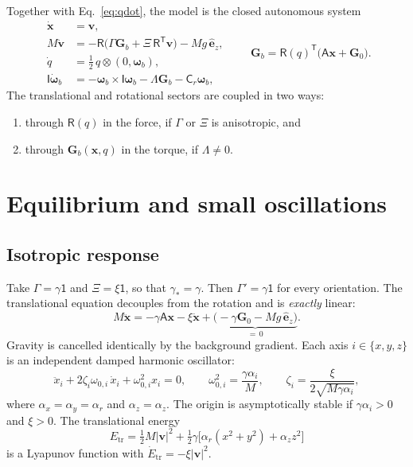 \documentclass[11pt]{article}
\newcommand{\vect}[1]{\bm{#1}}
\newcommand{\tens}[1]{\mathsf{#1}}
\newcommand{\ez}{\hat{\vect{e}}_z}
\newcommand{\Rm}{\tens{R}}
\newcommand{\Gl}{\vect{G}}
\newcommand{\Gb}{\vect{G}_{b}}
\newcommand{\T}{^{\mathsf{T}}}
\theoremstyle{remark}
\begin{document}
Together with Eq.~\eqref{eq:qdot}, the model is the closed autonomous
system
\begin{equation}
  \boxed{
  \begin{aligned}
    \dot{\vect{x}} &= \vect{v},\\
    M\dot{\vect{v}} &= -\Rm\bigl(\tens{\Gamma}\Gb + \tens{\Xi}\,\Rm\T\vect{v}\bigr) - Mg\,\ez,\\
    \dot q &= \tfrac12\,q\otimes(0,\vect{\omega}_b),\\
    \tens{I}\dot{\vect{\omega}}_b &= -\vect{\omega}_b\times\tens{I}\vect{\omega}_b
        - \tens{\Lambda}\Gb - \tens{C}_r\vect{\omega}_b,
  \end{aligned}
  \qquad \Gb = \Rm(q)\T\bigl(\tens{A}\vect{x}+\Gl_0\bigr).}
\end{equation}
The translational and rotational sectors are coupled in two ways:
\begin{enumerate}
  \item through $\Rm(q)$ in the force, if $\tens{\Gamma}$ or
        $\tens{\Xi}$ is anisotropic, and
  \item through $\Gb(\vect{x},q)$ in the torque, if $\tens{\Lambda}\neq0$.
\end{enumerate}

\section{Equilibrium and small oscillations}
\label{sec:equilibrium}

\subsection{Isotropic response}

Take $\tens{\Gamma}=\gamma\tens{1}$ and $\tens{\Xi}=\xi\tens{1}$, so that
$\gamma_\ast=\gamma$. Then $\tens{\Gamma}'=\gamma\tens{1}$ for every
orientation. The translational equation decouples from the rotation and
is \emph{exactly} linear:
\begin{equation}
  M\ddot{\vect{x}} = -\gamma\tens{A}\vect{x} - \xi\dot{\vect{x}}
  + \underbrace{\bigl(-\gamma\Gl_0 - Mg\,\ez\bigr)}_{=\,0}.
\end{equation}
Gravity is cancelled identically by the background gradient. Each axis
$i\in\{x,y,z\}$ is an independent damped harmonic oscillator:
\begin{equation}
  \ddot x_i + 2\zeta_i\omega_{0,i}\,\dot x_i + \omega_{0,i}^2 x_i = 0,
  \qquad
  \omega_{0,i}^2 = \frac{\gamma\alpha_i}{M},
  \qquad
  \zeta_i = \frac{\xi}{2\sqrt{M\gamma\alpha_i}} ,
\end{equation}
where $\alpha_{x}=\alpha_y=\alpha_r$ and $\alpha_z=\alpha_z$. The origin is
asymptotically stable if $\gamma\alpha_i>0$ and $\xi>0$. The translational
energy
\begin{equation}
  E_{\text{tr}} = \tfrac12 M|\vect{v}|^2
  + \tfrac12\gamma\bigl[\alpha_r(x^2+y^2)+\alpha_z z^2\bigr]
\end{equation}
is a Lyapunov function with $\dot E_{\text{tr}} = -\xi|\vect{v}|^2$.
\end{document}
